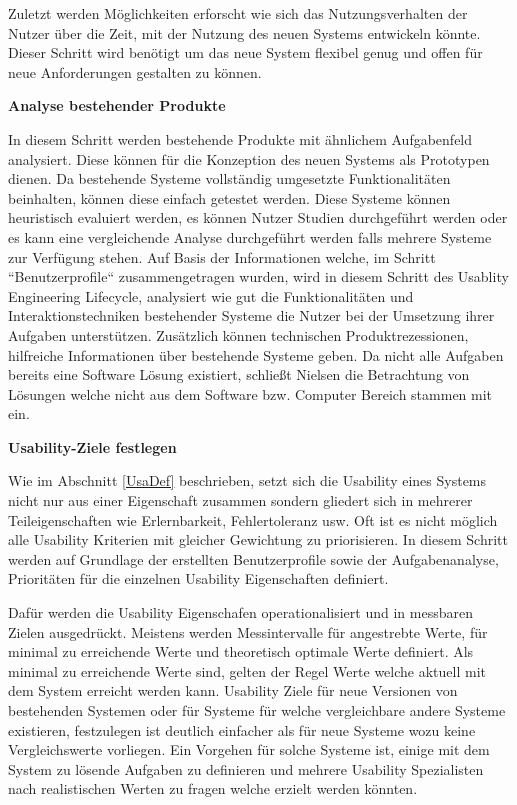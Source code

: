 \cite[S.~78]{Nielsen1994} Zuletzt werden Möglichkeiten erforscht wie sich das Nutzungsverhalten der Nutzer über die Zeit, mit der Nutzung des neuen Systems entwickeln könnte. Dieser Schritt wird  
benötigt um das neue System flexibel genug und offen für neue Anforderungen gestalten zu können. 

\vspace{5mm} 
\textbf{Analyse bestehender Produkte} 
 
\cite[S.~78]{Nielsen1994} In diesem Schritt werden bestehende Produkte mit ähnlichem Aufgabenfeld analysiert. Diese können für die Konzeption des neuen Systems als Prototypen dienen. 
Da bestehende Systeme vollständig umgesetzte Funktionalitäten beinhalten, können diese einfach getestet werden.    
Diese Systeme können heuristisch evaluiert werden, es können Nutzer Studien durchgeführt werden oder es kann eine vergleichende Analyse durchgeführt werden falls mehrere Systeme zur 
Verfügung stehen. Auf Basis der Informationen welche, im Schritt ``Benutzerprofile`` zusammengetragen wurden, wird in diesem Schritt des Usablity Engineering Lifecycle, analysiert wie gut die Funktionalitäten und Interaktionstechniken 
bestehender Systeme die Nutzer bei der Umsetzung ihrer Aufgaben unterstützen. Zusätzlich können technischen Produktrezessionen, hilfreiche Informationen über bestehende Systeme geben. 
Da nicht alle Aufgaben bereits eine Software Lösung existiert, schließt Nielsen die Betrachtung von Lösungen welche nicht aus dem Software bzw. Computer Bereich stammen mit ein. 

\vspace{5mm} 
\textbf{Usability-Ziele festlegen} 

Wie im Abschnitt \ref{UsaDef} beschrieben, setzt sich die Usability eines Systems nicht nur aus einer Eigenschaft zusammen sondern gliedert sich in mehrerer Teileigenschaften wie Erlernbarkeit, Fehlertoleranz usw. \cite[S.~79]{Nielsen1994} Oft ist es nicht möglich alle Usability Kriterien mit gleicher Gewichtung zu priorisieren. In diesem Schritt werden auf Grundlage der erstellten Benutzerprofile sowie der Aufgabenanalyse, Prioritäten für die einzelnen Usability Eigenschaften definiert. 

Dafür werden die Usability Eigenschafen operationalisiert und in messbaren Zielen ausgedrückt. Meistens werden Messintervalle für angestrebte Werte, für minimal zu erreichende Werte und theoretisch optimale Werte definiert. Als minimal zu erreichende Werte sind, gelten der Regel Werte welche aktuell mit dem System erreicht werden kann. Usability Ziele für neue Versionen von bestehenden Systemen oder für Systeme für welche vergleichbare andere Systeme existieren, festzulegen ist deutlich einfacher als für neue Systeme wozu keine Vergleichswerte vorliegen. Ein Vorgehen für solche Systeme ist, einige mit dem System zu lösende Aufgaben zu definieren und mehrere Usability Spezialisten nach realistischen Werten zu fragen welche erzielt werden könnten.


